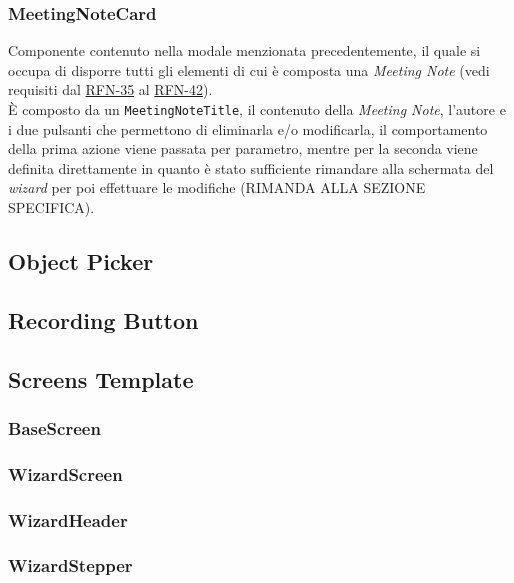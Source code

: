 \subsubsection*{MeetingNoteCard}
\label{subsubsec:meeting-note-card}

Componente contenuto nella modale menzionata precedentemente, il quale si occupa di disporre tutti gli elementi di cui è composta una \emph{Meeting Note} (vedi requisiti dal \hyperref[RFN-35]{RFN-35} al \hyperref[RFN-42]{RFN-42}).\\
È composto da un \lstinline{MeetingNoteTitle}, il contenuto della \emph{Meeting Note}, l'autore e i due pulsanti che permettono di eliminarla e/o modificarla, il comportamento della prima azione viene passata per parametro, mentre per la seconda viene definita direttamente in quanto è stato sufficiente rimandare alla schermata del \emph{wizard} per poi effettuare le modifiche (RIMANDA ALLA SEZIONE SPECIFICA).

\subsection{Object Picker}
\label{subsec:object-picker}

\subsection{Recording Button}
\label{subsec:recording-button}

\subsection{Screens Template}
\label{subsec:screens-template}

\subsubsection*{BaseScreen}
\label{subsubsec:base-screen}

\subsubsection*{WizardScreen}
\label{subsubsec:wizard-screen}

\subsubsection*{WizardHeader}
\label{subsubsec:wizard-header}

\subsubsection*{WizardStepper}
\label{subsubsec:wizard-stepper}

